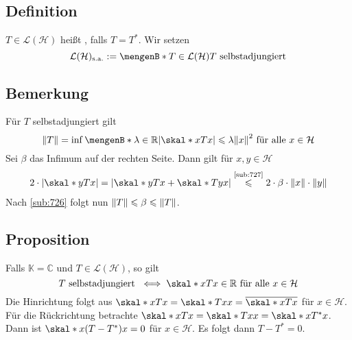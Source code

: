 \subsection[Definition: Selbstadjungierter Operator]{Definition} %
\label{sub:728}
$T \in \mathcal{L}(\mathcal{H})$ heißt , falls $T=T^*$. Wir setzen
\[
	\mathcal{L}(\mathcal{H})_\sa := \set[T \in \mathcal{L}(\mathcal{H})]{T \text{ selbstadjungiert}} 
\]

\subsection[Bemerkung: Operatornorm von selbstadjungierten Operatoren als ein Infimum]{Bemerkung} %
\label{sub:729}
Für $T$ selbstadjungiert gilt 
\[
	\norm{T}= \inf \set[\lambda \in \mathds{R}]{\abs*{\skal*{x}{T x}} \le \lambda \norm{x}^2 \text{ für alle } x \in \mathcal{H}}  
\]
Sei $\beta$ das Infimum auf der rechten Seite. Dann gilt für $x,y \in \mathcal{H}$
\begin{align*}
	2 \cdot \abs*{\skal*{y}{T x}} = \abs*{\skal*{y}{T x} + \skal*{T y}{x}} \stackrel{\mbox{\scriptsize \ref{sub:727}}}{\le} 2 \cdot \beta \cdot \norm{x} \cdot \norm{y} 
\end{align*}
Nach \ref{sub:726} folgt nun $\norm{T} \le \beta \le \norm{T}$. \bewende

\subsection[Proposition: Charakterisierung von selbstadjungiert im komplexen Fall]{Proposition} %
\label{sub:730}
Falls $\mathds{K}=\mathds{C}$ und $T \in \mathcal{L}(\mathcal{H})$, so gilt
\[
	T \text{ selbstadjungiert } \iff \skal*{x}{T x} \in \mathds{R} \text{ für alle } x \in \mathcal{H}
\]
Die Hinrichtung folgt aus $\skal*{x}{T x} = \skal*{T x}{x} = \overline{\skal*{x}{T x}}$ für $x \in \mathcal{H}$. Für die Rückrichtung betrachte
$\skal*{x}{T x} = \skal*{T x}{x} = \skal*{x}{T^* x}$. Dann ist $\skal*{x}{(T-T^*)x}=0$ für $x \in \mathcal{H}$. Es folgt dann $T- T^*=0$. \bewende 


